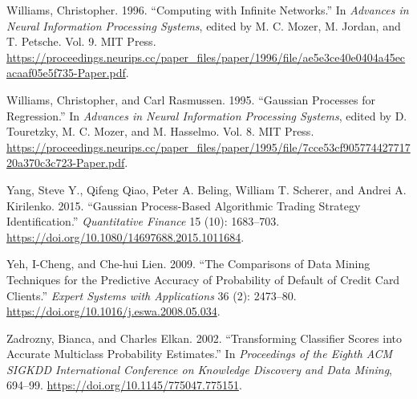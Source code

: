 \documentclass[
  letterpaper,
  DIV=11,
  numbers=noendperiod]{scrartcl}
\newlength{\cslhangindent}
\newenvironment{CSLReferences}[2] %
 {\begin{list}{}{%
  \setlength{\itemindent}{0pt}
  \setlength{\leftmargin}{0pt}
  \setlength{\parsep}{0pt}
  \ifodd #1
   \setlength{\leftmargin}{\cslhangindent}
   \setlength{\itemindent}{-1\cslhangindent}
  \fi
  \setlength{\itemsep}{#2\baselineskip}}}
 {\end{list}}
\begin{document}
\begin{CSLReferences}{1}{0}
Williams, Christopher. 1996. {``Computing with {Infinite} {Networks}.''}
In \emph{Advances in {Neural} {Information} {Processing} {Systems}},
edited by M. C. Mozer, M. Jordan, and T. Petsche. Vol. 9. MIT Press.
\url{https://proceedings.neurips.cc/paper_files/paper/1996/file/ae5e3ce40e0404a45ecacaaf05e5f735-Paper.pdf}.

Williams, Christopher, and Carl Rasmussen. 1995. {``Gaussian {Processes}
for {Regression}.''} In \emph{Advances in {Neural} {Information}
{Processing} {Systems}}, edited by D. Touretzky, M. C. Mozer, and M.
Hasselmo. Vol. 8. MIT Press.
\url{https://proceedings.neurips.cc/paper_files/paper/1995/file/7cce53cf90577442771720a370c3c723-Paper.pdf}.

Yang, Steve Y., Qifeng Qiao, Peter A. Beling, William T. Scherer, and
Andrei A. Kirilenko. 2015. {``Gaussian Process-Based Algorithmic Trading
Strategy Identification.''} \emph{Quantitative Finance} 15 (10):
1683--703. \url{https://doi.org/10.1080/14697688.2015.1011684}.

Yeh, I-Cheng, and Che-hui Lien. 2009. {``The Comparisons of Data Mining
Techniques for the Predictive Accuracy of Probability of Default of
Credit Card Clients.''} \emph{Expert Systems with Applications} 36 (2):
2473--80. \url{https://doi.org/10.1016/j.eswa.2008.05.034}.

Zadrozny, Bianca, and Charles Elkan. 2002. {``Transforming Classifier
Scores into Accurate Multiclass Probability Estimates.''} In
\emph{Proceedings of the Eighth ACM SIGKDD International Conference on
Knowledge Discovery and Data Mining}, 694--99.
\url{https://doi.org/10.1145/775047.775151}.

\end{CSLReferences}
\end{document}
